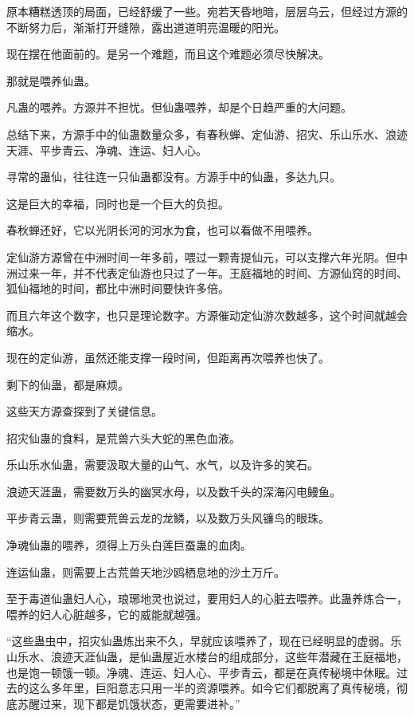 \begin{this_body}
原本糟糕透顶的局面，已经舒缓了一些。宛若天昏地暗，层层乌云，但经过方源的不断努力后，渐渐打开缝隙，露出道道明亮温暖的阳光。

现在摆在他面前的。是另一个难题，而且这个难题必须尽快解决。

那就是喂养仙蛊。

凡蛊的喂养。方源并不担忧。但仙蛊喂养，却是个日趋严重的大问题。

总结下来，方源手中的仙蛊数量众多，有春秋蝉、定仙游、招灾、乐山乐水、浪迹天涯、平步青云、净魂、连运、妇人心。

寻常的蛊仙，往往连一只仙蛊都没有。方源手中的仙蛊，多达九只。

这是巨大的幸福，同时也是一个巨大的负担。

春秋蝉还好，它以光阴长河的河水为食，也可以看做不用喂养。

定仙游方源曾在中洲时间一年多前，喂过一颗青提仙元，可以支撑六年光阴。但中洲过来一年，并不代表定仙游也只过了一年。王庭福地的时间、方源仙窍的时间、狐仙福地的时间，都比中洲时间要快许多倍。

而且六年这个数字，也只是理论数字。方源催动定仙游次数越多，这个时间就越会缩水。

现在的定仙游，虽然还能支撑一段时间，但距离再次喂养也快了。

剩下的仙蛊，都是麻烦。

这些天方源查探到了关键信息。

招灾仙蛊的食料，是荒兽六头大蛇的黑色血液。

乐山乐水仙蛊，需要汲取大量的山气、水气，以及许多的笑石。

浪迹天涯蛊，需要数万头的幽冥水母，以及数千头的深海闪电鳗鱼。

平步青云蛊，则需要荒兽云龙的龙鳞，以及数万头风镰鸟的眼珠。

净魂仙蛊的喂养，须得上万头白莲巨蚕蛊的血肉。

连运仙蛊，则需要上古荒兽天地沙鸥栖息地的沙土万斤。

至于毒道仙蛊妇人心，琅琊地灵也说过，要用妇人的心脏去喂养。此蛊养炼合一，喂养的妇人心脏越多，它的威能就越强。

“这些蛊虫中，招灾仙蛊炼出来不久，早就应该喂养了，现在已经明显的虚弱。乐山乐水、浪迹天涯仙蛊，是仙蛊屋近水楼台的组成部分，这些年潜藏在王庭福地，也是饱一顿饿一顿。净魂、连运、妇人心、平步青云，都是在真传秘境中休眠。过去的这么多年里，巨阳意志只用一半的资源喂养。如今它们都脱离了真传秘境，彻底苏醒过来，现下都是饥饿状态，更需要进补。”


\end{this_body}
